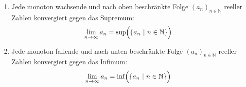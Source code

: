 \begin{enumerate}[label=\alph*)]
    \item Jede monoton wachsende und nach oben beschränkte Folge $(a_n)_{n\in\mathbb{N}}$ reeller Zahlen konvergiert gegen das Supremum:
    $$\lim_{n \to \infty} a_n = \sup\Bigl(\{a_n \ | \ n \in \mathbb{N}\}\Bigl)$$
    \item Jede monoton fallende und nach unten beschränkte Folge $(a_n)_{n\in\mathbb{N}}$ reeller Zahlen konvergiert gegen das Infimum:
    $$\lim_{n \to \infty} a_n = \inf\Bigl(\{a_n \ | \ n \in \mathbb{N}\}\Bigl)$$
\end{enumerate}